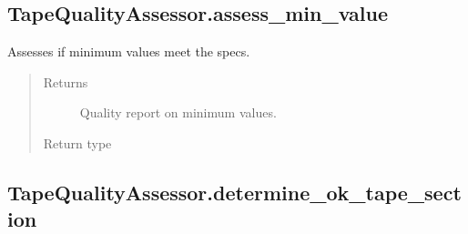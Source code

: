 \documentclass[letterpaper,10pt,english]{sphinxmanual}
\begin{document}
\begin{fulllineitems}
\begin{fulllineitems}
\end{fulllineitems}



\subsection{TapeQualityAssessor.assess\_min\_value}
\label{\detokenize{generated/quality_assessment.quality_assessor.TapeQualityAssessor.assess_min_value:tapequalityassessor-assess-min-value}}\label{\detokenize{generated/quality_assessment.quality_assessor.TapeQualityAssessor.assess_min_value::doc}}

\begin{fulllineitems}
\label{\detokenize{generated/quality_assessment.quality_assessor.TapeQualityAssessor.assess_min_value:quality_assessment.quality_assessor.TapeQualityAssessor.assess_min_value}}
\sphinxAtStartPar
Assesses if minimum values meet the specs.
\begin{quote}\begin{description}
\item[{Returns}] \leavevmode
\sphinxAtStartPar
Quality report on minimum values.

\item[{Return type}] \leavevmode
\sphinxAtStartPar
{\hyperref[\detokenize{generated/quality_assessment.data_types.QualityReport:quality_assessment.data_types.QualityReport}]{}}

\end{description}\end{quote}

\end{fulllineitems}



\subsection{TapeQualityAssessor.determine\_ok\_tape\_section}
\label{\detokenize{generated/quality_assessment.quality_assessor.TapeQualityAssessor.determine_ok_tape_section:tapequalityassessor-determine-ok-tape-section}}\label{\detokenize{generated/quality_assessment.quality_assessor.TapeQualityAssessor.determine_ok_tape_section::doc}}


\end{fulllineitems}
\end{document}
